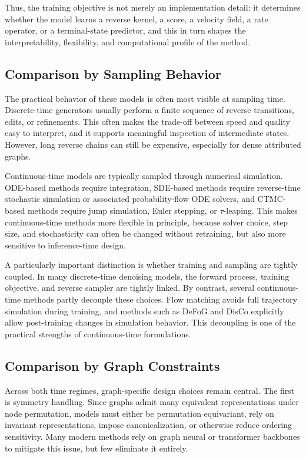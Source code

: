 \documentclass{article}
\begin{document}
Thus, the training objective is not merely an implementation detail: it determines whether the model learns a reverse kernel, a score, a velocity field, a rate operator, or a terminal-state predictor, and this in turn shapes the interpretability, flexibility, and computational profile of the method.


\subsection{Comparison by Sampling Behavior}
\label{sec:compare_sampling}

The practical behavior of these models is often most visible at sampling time. Discrete-time generators usually perform a finite sequence of reverse transitions, edits, or refinements. This often makes the trade-off between speed and quality easy to interpret, and it supports meaningful inspection of intermediate states. However, long reverse chains can still be expensive, especially for dense attributed graphs.

Continuous-time models are typically sampled through numerical simulation. ODE-based methods require integration, SDE-based methods require reverse-time stochastic simulation or associated probability-flow ODE solvers, and CTMC-based methods require jump simulation, Euler stepping, or $\tau$-leaping. This makes continuous-time methods more flexible in principle, because solver choice, step size, and stochasticity can often be changed without retraining, but also more sensitive to inference-time design.

A particularly important distinction is whether training and sampling are tightly coupled. In many discrete-time denoising models, the forward process, training objective, and reverse sampler are tightly linked. By contrast, several continuous-time methods partly decouple these choices. Flow matching avoids full trajectory simulation during training, and methods such as DeFoG and DisCo explicitly allow post-training changes in simulation behavior. This decoupling is one of the practical strengths of continuous-time formulations.

\subsection{Comparison by Graph Constraints}
\label{sec:compare_constraints}

Across both time regimes, graph-specific design choices remain central. The first is symmetry handling. Since graphs admit many equivalent representations under node permutation, models must either be permutation equivariant, rely on invariant representations, impose canonicalization, or otherwise reduce ordering sensitivity. Many modern methods rely on graph neural or transformer backbones to mitigate this issue, but few eliminate it entirely.
\end{document}
